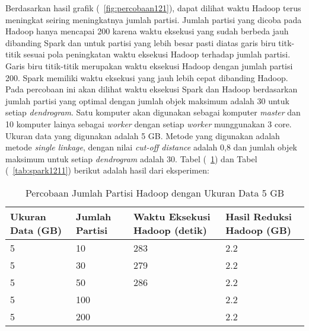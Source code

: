 Berdasarkan hasil grafik (~\ref{fig:percobaan121}), dapat dilihat waktu Hadoop terus meningkat seiring meningkatnya jumlah partisi. Jumlah partisi yang dicoba pada Hadoop hanya mencapai 200 karena waktu eksekusi yang sudah berbeda jauh dibanding Spark dan untuk partisi yang lebih besar pasti diatas garis biru titk-titik sesuai pola peningkatan waktu eksekusi Hadoop terhadap jumlah partisi. Garis biru titik-titik merupakan waktu eksekusi Hadoop dengan jumlah partisi 200. Spark memiliki waktu eksekusi yang jauh lebih cepat dibanding Hadoop. \\













Pada percobaan ini akan dilihat waktu eksekusi Spark dan Hadoop berdasarkan jumlah partisi yang optimal dengan jumlah objek maksimum adalah 30 untuk setiap \textit{dendrogram}. Satu komputer akan digunakan sebagai komputer \textit{master} dan 10 komputer lainya sebagai \textit{worker} dengan setiap \textit{worker} munggunakan 3 core. Ukuran data yang digunakan adalah 5 GB. Metode yang digunakan adalah metode \textit{single linkage}, dengan nilai \textit{cut-off distance} adalah 0,8 dan jumlah objek maksimum untuk setiap \textit{dendrogram} adalah 30. Tabel (~\ref{tab:spark1111}) dan Tabel (~\ref{tab:spark1211}) berikut adalah hasil dari eksperimen:





\begin{table}[H] 
	\centering 
	\caption{Percobaan Jumlah Partisi Hadoop dengan Ukuran Data 5 GB}
	\label{tab:spark1111}
	\begin{tabular}{|p{3cm}|p{3cm}|p{4cm}|p{4cm}|}
\hline
Ukuran Data (GB) & Jumlah Partisi &  Waktu Eksekusi Hadoop (detik) & Hasil Reduksi Hadoop (GB)\\
\hline
5 & 10 & 283  & 2.2  \\
\hline
5 & 30 & 279  & 2.2  \\
\hline
5 & 50 & 286  & 2.2   \\
\hline
5 & 100 &   & 2.2   \\
\hline
5 & 200 &   & 2.2   \\
\hline


\hline

	\end{tabular} 
\end{table}






